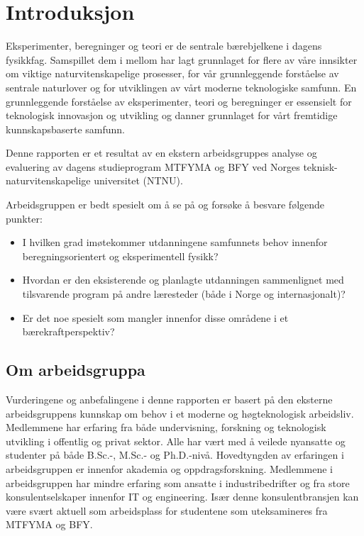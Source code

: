 \documentclass{article}
\begin{document}
\clearpage
\tableofcontents

\clearpage
\section{Introduksjon}
Eksperimenter, beregninger og teori er de sentrale bærebjelkene i dagens fysikkfag. Samspillet dem i mellom  har lagt grunnlaget for flere av våre innsikter om viktige naturvitenskapelige prosesser, for vår grunnleggende forståelse av sentrale naturlover og for utviklingen av vårt moderne teknologiske samfunn. En grunnleggende forståelse av eksperimenter, teori og beregninger er essensielt for  teknologisk innovasjon og utvikling og danner grunnlaget for vårt fremtidige kunnskapsbaserte samfunn.

Denne rapporten er et resultat av en ekstern arbeidsgruppes analyse og evaluering av dagens studieprogram MTFYMA og BFY ved Norges teknisk-naturvitenskapelige universitet (NTNU).

Arbeidsgruppen er bedt spesielt om å se på og forsøke å besvare følgende punkter:
\begin{itemize}
  \item I hvilken grad imøtekommer utdanningene samfunnets behov innenfor beregningsorientert og eksperimentell fysikk?
  \item Hvordan er den eksisterende og planlagte utdanningen sammenlignet med tilsvarende program på andre læresteder (både i Norge og internasjonalt)?
  \item Er det noe spesielt som mangler innenfor disse områdene i et bærekraftperspektiv?
\end{itemize}

\subsection{Om arbeidsgruppa}
Vurderingene og anbefalingene i denne rapporten er basert på den eksterne arbeidsgruppens kunnskap om behov i et moderne og høgteknologisk arbeidsliv.  Medlemmene har erfaring fra både undervisning, forskning og teknologisk utvikling i offentlig og privat sektor. Alle har vært med å veilede nyansatte og studenter på både B.Sc.-, M.Sc.- og Ph.D.-nivå. Hovedtyngden av erfaringen i arbeidsgruppen er innenfor akademia og oppdragsforskning. Medlemmene i arbeidsgruppen har mindre erfaring som ansatte i industribedrifter og fra store konsulentselskaper innenfor IT og engineering. Især denne konsulentbransjen kan være svært aktuell som arbeidsplass for studentene som uteksamineres fra MTFYMA og BFY.
\end{document}

